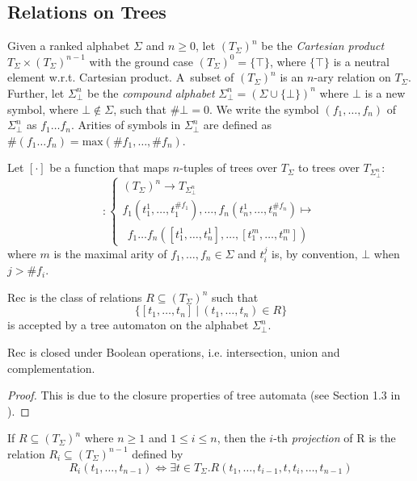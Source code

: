  \subsection{Relations on Trees}

Given a ranked alphabet $\Sigma$ and $n \geq 0$, let $(T_\Sigma)^n$ be the \emph{Cartesian product} $T_\Sigma \times (T_\Sigma)^{n-1}$ with the ground case $(T_\Sigma)^0 = \{\top\}$, where $\{\top\}$ is a neutral element w.r.t. Cartesian product. A~subset of $(T_\Sigma)^n$ is an $n$-ary relation on $T_\Sigma$. Further, let $\Sigma^n_\bot$ be the \emph{compound alphabet} $\Sigma_\bot^n = (\Sigma \cup \{\bot\})^n$ where $\bot$ is a new symbol, where $\bot \notin \Sigma$, such that $\#\bot = 0$. We write the symbol $(f_1,\ldots,f_n)$ of $\Sigma_\bot^n$ as $f_1\ldots f_n$. Arities of symbols in $\Sigma_\bot^n$ are defined as $\#(f_1\ldots f_n) = \text{max}(\#f_1,\ldots,\#f_n)$.

Let $[\cdot]$ be a function that maps $n$-tuples of trees over $T_\Sigma$ to trees over $T_{\Sigma_\bot^n}$:
\begin{equation}
    [\cdot] :
    \begin{cases}
     (T_\Sigma)^n \rightarrow T_{\Sigma^n_\bot}\\
		 f_1(t_1^1,\ldots,t^{\#f_1}_1),\ldots,f_n(t_n^1,\ldots,t^{\#f_n}_n) \mapsto\\
		 \ \ f_1\ldots f_n([t_1^1,\ldots,t_n^1],\ldots,[t_1^m,\ldots,t_n^m])
   \end{cases}
\end{equation}
 where $m$ is the maximal arity of $f_1,\ldots,f_n \in \Sigma$ and $t_i^j$ is, by convention, $\bot$ when $j > \#f_i$.

\begin{defz}
Rec is the class of relations $R \subseteq (T_\Sigma)^n$ such that $$\{[t_1,\ldots,t_n]\ |\ (t_1,\ldots,t_n) \in R\}$$ is accepted by a tree automaton on the alphabet $\Sigma_\bot^n$.
\end{defz}

\begin{prop}
Rec is closed under Boolean operations, i.e. intersection, union and complementation.
\end{prop}

\begin{proof}
This is due to the closure properties of tree automata (see Section 1.3 in \cite{tata}).
\end{proof}

\begin{defz}
If $R \subseteq (T_\Sigma)^n$ where $n \geq 1$ and $1 \leq i \leq n$, then the $i$-th \emph{projection} of R is the relation $R_i \subseteq (T_\Sigma)^{n-1}$ defined by $$ R_i(t_1,\ldots,t_{n-1}) \Leftrightarrow \exists t \in T_\Sigma . R(t_1,\ldots,t_{i-1},t,t_i,\ldots,t_{n-1})$$
\end{defz}

